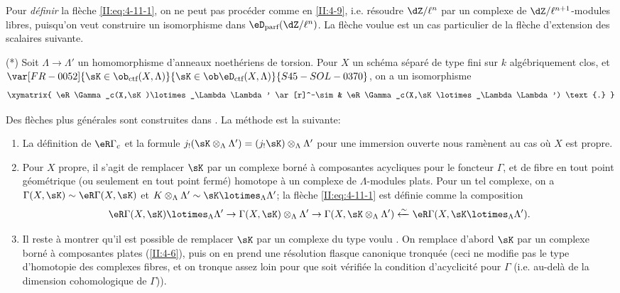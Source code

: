 Pour \emph{définir} la flèche \eqref{II:eq:4-11-1}, on ne peut pas 
procéder comme en \ref{II:4-9}, i.e. résoudre $\dZ/\ell^n$ par un complexe 
de $\dZ/\ell^{n+1}$-modules libres, puisqu'on veut construire un isomorphisme 
dans $\eD_\text{parf}(\dZ/\ell^n)$. La flèche voulue est un cas particulier de 
la flèche d'extension des scalaires suivante. 

(*) Soit $\Lambda\to\Lambda'$ un homomorphisme d'anneaux noethériens de 
torsion. Pour $X$ un schéma séparé de type fini sur $k$ algébriquement 
clos, et $\var[FR-0052]{\sK\in\ob_{\text{ctf}}(X,\Lambda)}{\sK\in\ob\eD_\text{ctf}(X,\Lambda)}{S45-SOL-0370}$, on a un isomorphisme 
\[\xymatrix{
  \eR\Gamma_c(X,\sK)\lotimes_\Lambda \Lambda' \ar[r]^-\sim & \eR \Gamma_c(X,\sK\lotimes_\Lambda \Lambda') \text{.}
}\]

Des flèches plus générales sont construites dans . La 
m\'
ethode est la suivante: 
\begin{enumerate}[\indent a)]
  \item {}La définition de $\eR\Gamma_c$ et la formule 
    $j_!(\sK\otimes_\Lambda\Lambda') = (j_! \sK)\otimes_\Lambda\Lambda'$ pour une 
    immersion ouverte nous ramènent au cas où $X$ est propre. 
  \item Pour $X$ propre, il s'agit de remplacer $\sK$ par un complexe borné à 
    composantes acycliques pour le foncteur $\Gamma$, et de fibre en tout point 
    géométrique (ou seulement en tout point fermé) homotope à un 
    complexe de $\Lambda$-modules plats. Pour un tel complexe, on a 
    $\Gamma(X,\sK)\sim \eR\Gamma(X,\sK)$ et 
    $K\otimes_\Lambda\Lambda'\sim \sK\lotimes_\Lambda\Lambda'$; la flèche 
    \eqref{II:eq:4-11-1} est définie comme la composition 
    \[
      \eR\Gamma(X,\sK)\lotimes_\Lambda \Lambda' \to \Gamma(X,\sK)\otimes_\Lambda\Lambda' \to \Gamma(X,\sK\otimes_\Lambda\Lambda') \xleftarrow\sim \eR\Gamma(X,\sK\lotimes_\Lambda\Lambda') \text{.}
    \]
  \item Il reste à montrer qu'il est possible de remplacer $\sK$ par un 
    complexe du type voulu . On remplace d'abord $\sK$ par 
    un complexe borné à composantes plates (\ref{II:4-6}), puis on en prend 
    une résolution flasque canonique tronquée (ceci ne modifie pas le type 
    d'homotopie des complexes fibres, et on tronque assez loin pour que 
    soit vérifiée la condition d'acyclicité pour $\Gamma$ (i.e. au-delà 
    de la dimension cohomologique de $\Gamma$)). 
\end{enumerate}





